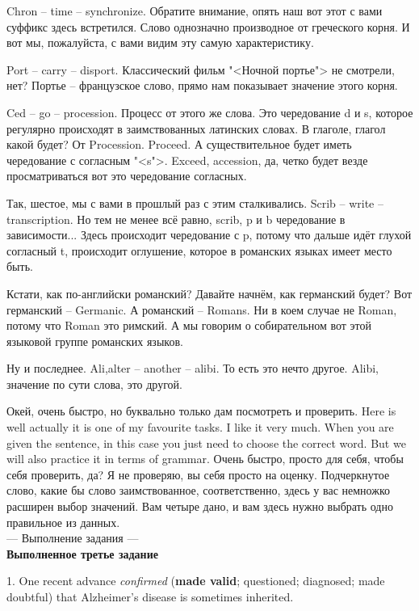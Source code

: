 \documentclass[main.tex]{subfiles}
\begin{document}
Chron -- time -- synchronize.
Обратите внимание, опять наш вот этот с вами суффикс здесь встретился.
Слово однозначно производное от греческого корня.
И вот мы, пожалуйста, с вами видим эту самую характеристику.

Port -- carry -- disport.
Классический фильм "<Ночной портье"> не смотрели, нет?
Портье -- французское слово, прямо нам показывает значение этого корня.

Ced -- go -- procession.
Процесс от этого же слова.
Это чередование d и s, которое регулярно происходят в заимствованных латинских словах.
В глаголе, глагол какой будет? От Procession.
Proceed.
А существительное будет иметь чередование с согласным "<s">.
Exceed, accession, да, четко будет везде просматриваться вот это чередование согласных.


Так, шестое, мы с вами в прошлый раз с этим сталкивались.
Scrib -- write -- transcription.
Но тем не менее всё равно, scrib, p и b чередование в зависимости...
Здесь происходит чередование с p, потому что дальше идёт глухой согласный t, происходит оглушение, которое в романских языках имеет место быть.

Кстати, как по-английски романский?
Давайте начнём, как германский будет?
Вот германский -- Germanic.
А романский -- Romans.
Ни в коем случае не Roman, потому что Roman это римский.
А мы говорим о собирательном вот этой языковой группе романских языков.

Ну и последнее.
Ali,alter -- another -- alibi.
То есть это нечто другое.
Alibi, значение по сути слова, это другой.

Окей, очень быстро, но буквально только дам посмотреть и проверить.
Here is well actually it is one of my favourite tasks.
I like it very much.
When you are given the sentence, in this case you just need to choose the correct word.
But we will also practice it in terms of grammar.
Очень быстро, просто для себя, чтобы себя проверить, да?
Я не проверяю, вы себя просто на оценку.
Подчеркнутое слово, какие бы слово заимствованное, соответственно, здесь у вас немножко расширен выбор значений.
Вам четыре дано, и вам здесь нужно выбрать одно правильное из данных.
\\

--- Выполнение задания ---
\\

\textbf{Выполненное третье задание}

1. One recent advance \textit{confirmed} (\textbf{made valid}; questioned; diagnosed; made doubtful) that Alzheimer's disease is sometimes inherited.
\end{document}
